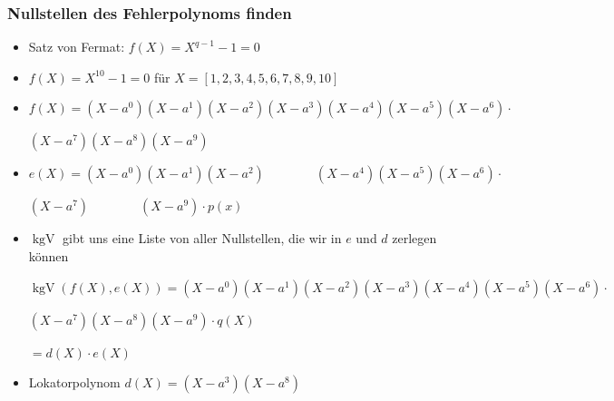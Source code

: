 \documentclass[11pt,aspectratio=169]{beamer}
\begin{document}
	\begin{frame}
		\frametitle{Nullstellen des Fehlerpolynoms finden}
		
		\begin{itemize}
			
			\item Satz von Fermat: $f(X) = X^{q-1}-1=0$
			
			\vspace{10pt}
			
			\item $f(X) = X^{10}-1 = 0$ \qquad für $X = [1,2,3,4,5,6,7,8,9,10]$
			
			\vspace{10pt}
			
			\item $f(X) = (X-a^0)(X-a^1)(X-a^2)(X-a^3)(X-a^4)(X-a^5)(X-a^6) \cdot$
			
			\qquad \qquad $(X-a^7)(X-a^8)(X-a^9)$
			
			\vspace{10pt}
			
			\item $e(X) = (X-a^0)(X-a^1)(X-a^2) \qquad \qquad (X-a^4)(X-a^5)(X-a^6) \cdot$
			
			\qquad \qquad $(X-a^7) \qquad \qquad (X-a^9) \cdot p(x)$
			
			\vspace{10pt}
			
			\item $\operatorname{kgV}$ gibt uns eine Liste von aller Nullstellen, die wir in $e$ und $d$ zerlegen können
			
			\vspace{10pt}
			
			$\operatorname{kgV}(f(X),e(X)) = (X-a^0)(X-a^1)(X-a^2)(X-a^3)(X-a^4)(X-a^5)(X-a^6) \cdot $
			
			\qquad \qquad \qquad \qquad $(X-a^7)(X-a^8)(X-a^9) \cdot q(X)$
			
			$= d(X) \cdot e(X)$
			
			\vspace{10pt}
			
			\item Lokatorpolynom $d(X) = (X-a^3)(X-a^8)$
			
		\end{itemize}
	
	\end{frame}
\end{document}
